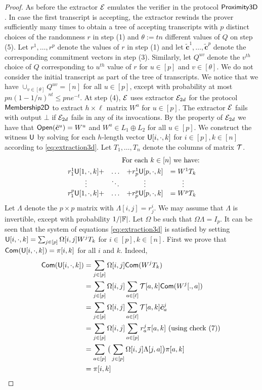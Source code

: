 \begin{proof}
As before the extractor $\mathcal{E}$ emulates the verifier in the protocol
$\mathsf{Proximity3D}$. In case the first transcript is accepting, the extractor
rewinds the prover sufficiently many times to obtain a tree of accepting transcripts with $p$ distinct
choices of the randomness $r$ in step (1) and $\theta := tn$ different values of $Q$
on step (5). Let $r^{1},\ldots,r^{p}$ denote the values of $r$ in step (1)
and let $\tilde{\mathbf{c}}^{1},\ldots,\tilde{\mathbf{c}}^{p}$ denote the corresponding
commitment vectors in step (3). Similarly, let $Q^{uv}$ denote the $v^{th}$
choice of $Q$ corresponding to $u^{th}$ value of $r$ for $u\in [p]$ and $v\in
[\theta]$. We do not consider the initial transcript as part of the tree of
transcripts. We notice that we have $\cup_{v\in [\theta]}Q^{uv}=[n]$ for all
$u\in [p]$, except with probability at most $pn(1-1/n)^{nt}\leq pne^{-t}$. At
step (4), $\mathcal{E}$ uses extractor $\mathcal{E}_{2d}$ for the protocol $\mathsf{Membership2D}$
to extract $h\times \ell$ matrix $W^{u}$ for $u\in [p]$. The extractor $\mathcal{E}$ fails with output $\bot$
if $\mathcal{E}_{2d}$ fails in any of its invocations. By the property of $\mathcal{E}_{2d}$
we have that $\mathsf{Open}(\tilde{\bm{c}}^u)=W^u$ and $W^u\in L_1\oplus L_2$ for all
$u\in [p]$. We construct the witness $\mathsf{U}$ by solving for each $h$-length
vector $\mathsf{U}[i,\cdot,k]$ for $i\in [p], k\in [n]$ according to
\eqref{eq:extraction3d}. Let $T_1,\ldots,T_n$ denote the columns of matrix
$\mathcal{T}$. 
\begin{align}\label{eq:extraction3d}
\text{For each $k\in [n]$ we have:}  \nonumber \\
\begin{array}{cccc}
r^1_1\mathsf{U}[1,\cdot,k]+ &\hdots & +r^1_p\mathsf{U}[p,\cdot,k] &= W^1T_k \\
\vdots & \ddots & \vdots & \vdots \\
r^p_1\mathsf{U}[1,\cdot,k]+ &\hdots & +r^p_p\mathsf{U}[p,\cdot,k] &= W^pT_k 
\end{array}
\end{align}
Let $\Lambda$ denote the $p\times p$ matrix with $\Lambda[i,j]=r^i_j$. We may
assume that $\Lambda$ is invertible, except with probability $1/|\mathbb{F}|$. Let
$\Omega$ be such that $\Omega\Lambda = I_p$. It can be seen that the system of
equations \eqref{eq:extraction3d} is satisfied by setting $\mathsf{U}[i,\cdot,k]=\sum_{j\in
[p]}\Omega[i,j]W^jT_k$ for $i\in [p],k\in [n]$. First we prove that
$\mathsf{Com}(\mathsf{U}[i,\cdot,k])=\pi[i,k]$ for all $i$ and $k$. Indeed,
\begin{align*}
\mathsf{Com}(\mathsf{U}[i,\cdot,k]) & =\sum_{j\in [p]}\Omega[i,j]\mathsf{Com}(W^jT_k) \\
	& = \sum_{j\in [p]}\Omega[i,j]\sum_{a\in [\ell]}\mathcal{T}[a,k]\mathsf{Com}(W^j[.,a]) \\
	& = \sum_{j\in [p]}\Omega[i,j]\sum_{a\in
[\ell]}\mathcal{T}[a,k]\tilde{\bm{c}}^j_a \\
	& = \sum_{j\in [p]}\Omega[i,j]\sum_{a\in [p]}r^j_a\pi[a,k] \text{ (using check
(7)) } \\
	& = \sum_{a\in [p]} \big(\sum_{j\in [p]}\Omega[i,j]\Lambda[j,a]\big)\pi[a,k]
\\
	& = \pi[i,k]
\end{align*}


\end{proof}
